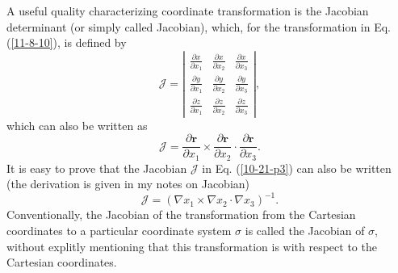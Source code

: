 \documentclass{llncs}
\begin{document}
A useful quality characterizing coordinate transformation is the Jacobian
determinant (or simply called Jacobian), which, for the transformation in Eq.
(\ref{11-8-10}), is defined by
\begin{equation}
  \label{21-11-29-1} \mathcal{J}= \left|\begin{array}{ccc}
    \frac{\partial x}{\partial x_1} & \frac{\partial x}{\partial x_2} &
    \frac{\partial x}{\partial x_3}\\
    \frac{\partial y}{\partial x_1} & \frac{\partial y}{\partial x_2} &
    \frac{\partial y}{\partial x_3}\\
    \frac{\partial z}{\partial x_1} & \frac{\partial z}{\partial x_2} &
    \frac{\partial z}{\partial x_3}
  \end{array}\right|,
\end{equation}
which can also be written as
\begin{equation}
  \label{10-21-p3} \mathcal{J}= \frac{\partial \mathbf{r}}{\partial x_1}
  \times \frac{\partial \mathbf{r}}{\partial x_2} \cdot \frac{\partial
  \mathbf{r}}{\partial x_3} .
\end{equation}
It is easy to prove that the Jacobian $\mathcal{J}$ in Eq. (\ref{10-21-p3})
can also be written (the derivation is given in my notes on Jacobian)
\begin{equation}
  \label{10-21-p4} \mathcal{J}= (\nabla x_1 \times \nabla x_2 \cdot \nabla
  x_3)^{- 1} .
\end{equation}
Conventionally, the Jacobian of the transformation from the Cartesian
coordinates to a particular coordinate system $\sigma$ is called the Jacobian
of $\sigma$, without explitly mentioning that this transformation is with
respect to the Cartesian coordinates.
\end{document}

